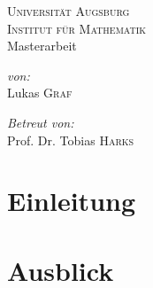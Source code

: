\documentclass[a4paper,ngerman,11pt,bibliography=totoc]{scrartcl}
\theoremstyle{definition}
\theoremstyle{plain}
\theoremstyle{remark}
\begin{document}
	
	
	

\author{Lukas Graf}
\date{Letzte Aktualisierung: \today}

\thispagestyle{empty}


\begin{titlepage}\center
	\textsc{\LARGE Universität Augsburg}\\[1cm]
	
	\textsc{\Large Institut für Mathematik}\\[1.5cm]
	
	{\Large Masterarbeit \\[1cm]}
	{\huge {}}

	\vfill
	
	\begin{minipage}{0.4\textwidth}
		\begin{flushleft} \large
			\emph{von:}\\
			Lukas \textsc{Graf}
		\end{flushleft}
	\end{minipage}
	\begin{minipage}{0.4\textwidth}
		\begin{flushright} \large
			\emph{Betreut von:} \\
			Prof. Dr. Tobias \textsc{Harks}
		\end{flushright}
	\end{minipage}
	
\end{titlepage}


\tableofcontents

\listoftodos

\newpage
{}
{}
\section*{Einleitung}







{}
\section*{Ausblick}



\newpage
\nocite{*}
\printbibliography
\end{document}
